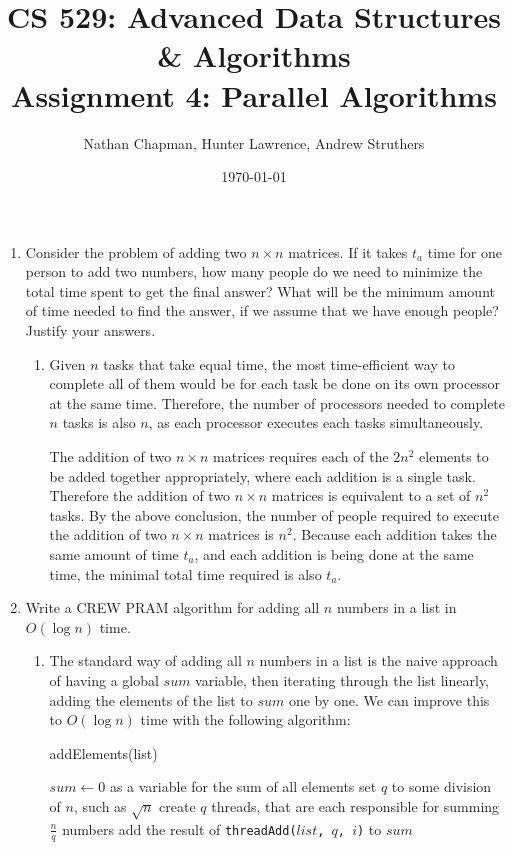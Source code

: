 \documentclass{article}
\title{\vspace*{-0.625in}CS 529: Advanced Data Structures \& Algorithms \\ Assignment 4: Parallel Algorithms}
\author{Nathan Chapman, Hunter Lawrence, Andrew Struthers}
\date{\today}
\renewcommand{\_}{\ifincsname_\else\legacyunderscore\fi}
\begin{document}
    \maketitle

\begin{enumerate}
	\item Consider the problem of adding two $n\times n$ matrices. If it takes $t_a$ time for one person to add two numbers, how many people do we need to minimize the total time spent to get the final answer? What will be the minimum amount of time needed to find the answer, if we assume that we have enough people? Justify your answers.
\begin{enumerate}
        \item

        Given $n$ tasks that take equal time, the most time-efficient way to complete all of them would be for each task be done on its own processor at the same time.  Therefore, the number of processors needed to complete $n$ tasks is also $n$, as each processor executes each tasks simultaneously.

        The addition of two $n \times n$ matrices requires each of the $2 n^2$ elements to be added together appropriately, where each addition is a single task.  Therefore the addition of two $n \times n$ matrices is equivalent to a set of $n^2$ tasks.  By the above conclusion, the number of people required to execute the addition of two $n \times n$ matrices is $n^2$. Because each addition takes the same amount of time $t_a$, and each addition is being done at the same time, the minimal total time required is also $t_a$.
\end{enumerate}

	\item Write a CREW PRAM algorithm for adding all $n$ numbers in a list in $O(\log n)$ time.
	\begin{enumerate}
		\item The standard way of adding all $n$ numbers in a list is the naive approach of having a global $sum$ variable, then iterating through the list linearly, adding the elements of the list to $sum$ one by one. We can improve this to $O(\log n)$ time with the following algorithm:

	\begin{function}
            \DontPrintSemicolon
            \caption{addElements(list)}
            \label{alg:addElements}
            $sum \gets 0$ as a variable for the sum of all elements\;
            set $q$ to some division of $n$, such as $\sqrt{n}$\;
            create $q$ threads, that are each responsible for summing $\frac{n}{q}$ numbers\;
            {
                add the result of \texttt{threadAdd($list$, $q$, $i$)} to $sum$
            }
        \end{function}


\end{enumerate}
\end{enumerate}
\end{document}
